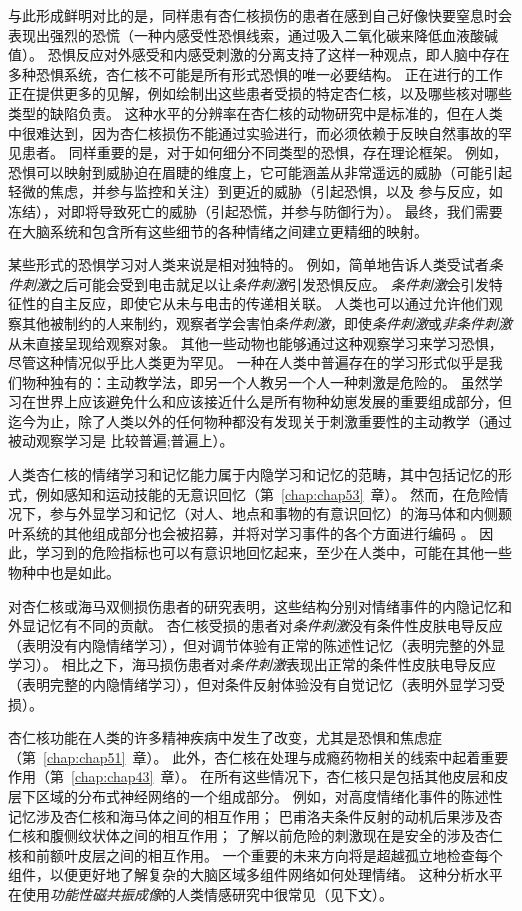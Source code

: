 与此形成鲜明对比的是，同样患有杏仁核损伤的患者在感到自己好像快要窒息时会表现出强烈的恐慌（一种内感受性恐惧线索，通过吸入二氧化碳来降低血液酸碱值）。
恐惧反应对外感受和内感受刺激的分离支持了这样一种观点，即人脑中存在多种恐惧系统，杏仁核不可能是所有形式恐惧的唯一必要结构。
正在进行的工作正在提供更多的见解，例如绘制出这些患者受损的特定杏仁核，以及哪些核对哪些类型的缺陷负责。
这种水平的分辨率在杏仁核的动物研究中是标准的，但在人类中很难达到，因为杏仁核损伤不能通过实验进行，而必须依赖于反映自然事故的罕见患者。
同样重要的是，对于如何细分不同类型的恐惧，存在理论框架。
例如，恐惧可以映射到威胁迫在眉睫的维度上，它可能涵盖从非常遥远的威胁（可能引起轻微的焦虑，并参与监控和关注）到更近的威胁（引起恐惧，以及 参与反应，如冻结），对即将导致死亡的威胁（引起恐慌，并参与防御行为）。
最终，我们需要在大脑系统和包含所有这些细节的各种情绪之间建立更精细的映射。


某些形式的恐惧学习对人类来说是相对独特的。
例如，简单地告诉人类受试者\textit{条件刺激}之后可能会受到电击就足以让\textit{条件刺激}引发恐惧反应。
\textit{条件刺激}会引发特征性的自主反应，即使它从未与电击的传递相关联。
人类也可以通过允许他们观察其他被制约的人来制约，观察者学会害怕\textit{条件刺激}，即使\textit{条件刺激}或\textit{非条件刺激}从未直接呈现给观察对象。
其他一些动物也能够通过这种观察学习来学习恐惧，尽管这种情况似乎比人类更为罕见。
一种在人类中普遍存在的学习形式似乎是我们物种独有的：主动教学法，即另一个人教另一个人一种刺激是危险的。
虽然学习在世界上应该避免什么和应该接近什么是所有物种幼崽发展的重要组成部分，但迄今为止，除了人类以外的任何物种都没有发现关于刺激重要性的主动教学（通过被动观察学习是 比较普遍;普遍上）。


人类杏仁核的情绪学习和记忆能力属于内隐学习和记忆的范畴，其中包括记忆的形式，例如感知和运动技能的无意识回忆（第~\ref{chap:chap53}~章）。
然而，在危险情况下，参与外显学习和记忆（对人、地点和事物的有意识回忆）的海马体和内侧颞叶系统的其他组成部分也会被招募，并将对学习事件的各个方面进行编码 。
因此，学习到的危险指标也可以有意识地回忆起来，至少在人类中，可能在其他一些物种中也是如此。


对杏仁核或海马双侧损伤患者的研究表明，这些结构分别对情绪事件的内隐记忆和外显记忆有不同的贡献。
杏仁核受损的患者对\textit{条件刺激}没有条件性皮肤电导反应（表明没有内隐情绪学习），但对调节体验有正常的陈述性记忆（表明完整的外显学习）。
相比之下，海马损伤患者对\textit{条件刺激}表现出正常的条件性皮肤电导反应（表明完整的内隐情绪学习），但对条件反射体验没有自觉记忆（表明外显学习受损）。


杏仁核功能在人类的许多精神疾病中发生了改变，尤其是恐惧和焦虑症（第~\ref{chap:chap51}~章）。
此外，杏仁核在处理与成瘾药物相关的线索中起着重要作用（第~\ref{chap:chap43}~章）。
在所有这些情况下，杏仁核只是包括其他皮层和皮层下区域的分布式神经网络的一个组成部分。
例如，对高度情绪化事件的陈述性记忆涉及杏仁核和海马体之间的相互作用；
巴甫洛夫条件反射的动机后果涉及杏仁核和腹侧纹状体之间的相互作用；
了解以前危险的刺激现在是安全的涉及杏仁核和前额叶皮层之间的相互作用。
一个重要的未来方向将是超越孤立地检查每个组件，以便更好地了解复杂的大脑区域多组件网络如何处理情绪。
这种分析水平在使用\textit{功能性磁共振成像}的人类情感研究中很常见（见下文）。



